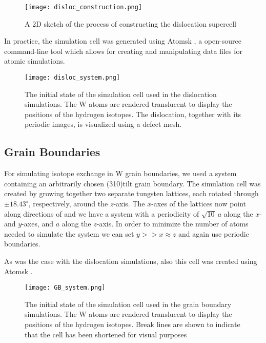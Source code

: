 \begin{figure}[!ht]
\center
\texttt{[image: disloc\_construction.png]}
\caption{A 2D sketch of the process of constructing the dislocation supercell}
\label{Fig:disloc_construction}
\end{figure}

In practice, the simulation cell was generated using Atomsk \cite{hirel2015atomsk}, a open-source command-line tool which allows for creating and manipulating data files for atomic simulations. 

\begin{figure}[!ht]
\center
\texttt{[image: disloc\_system.png]}
\caption{The initial state of the simulation cell used in the dislocation simulations. 
The W atoms are rendered translucent to display the positions of the hydrogen isotopes. 
The dislocation, together with its periodic images, is visualized using a defect mesh.}
\label{Fig:disloc_system}
\end{figure}

\subsection{Grain Boundaries}
For simulating isotope exchange in W grain boundaries, we used a system containing an arbitrarily chosen \hkl(310)\hkl[001] tilt grain boundary. The simulation cell was created by growing together two separate tungsten lattices, each rotated through $\pm18.43^\circ$, respectively, around the $z$-axis. 
The $x$-axes of the lattices now point along directions of  and we have a system with a periodicity of $\sqrt{10}~a$ along the $x$- and $y$-axes, and $a$ along the $z$-axis. 
In order to minimize the number of atoms needed to simulate the system we can set $y >> x \approx z$ and again use periodic boundaries.


As was the case with the dislocation simulations, also this cell was created using Atomsk \cite{hirel2015atomsk}.

\begin{figure}[!ht]
\center
\texttt{[image: GB\_system.png]}
\caption{The initial state of the simulation cell used in the grain boundary simulations. 
The W atoms are rendered translucent to display the positions of the hydrogen isotopes. Break lines are shown to indicate that the cell has been shortened for visual purposes}
\label{Fig:GB_system}
\end{figure}



